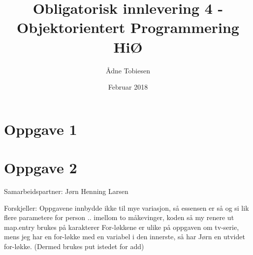 \documentclass{article}
\title{Obligatorisk innlevering 4 - Objektorientert Programmering HiØ}
\author{Ådne Tobiesen}
\date{Februar 2018}
\begin{document}
   \maketitle
   
   \section*{Oppgave 1}
   
   
   
   \newpage
   \section*{Oppgave 2}
   Samarbeidspartner: Jørn Henning Larsen
   
   Forskjeller:
    Oppgavene innbydde ikke til mye variasjon, så essensen er så og si lik
    flere parametere for person
    .. imellom to måkevinger, koden så my renere ut
    map.entry brukes på karakterer
    For-løkkene er ulike på oppgaven om tv-serie, mens jeg har en for-løkke med en variabel i den innerste, så har Jørn en utvidet for-løkke. (Dermed brukes put istedet for add)
  
\end{document}
